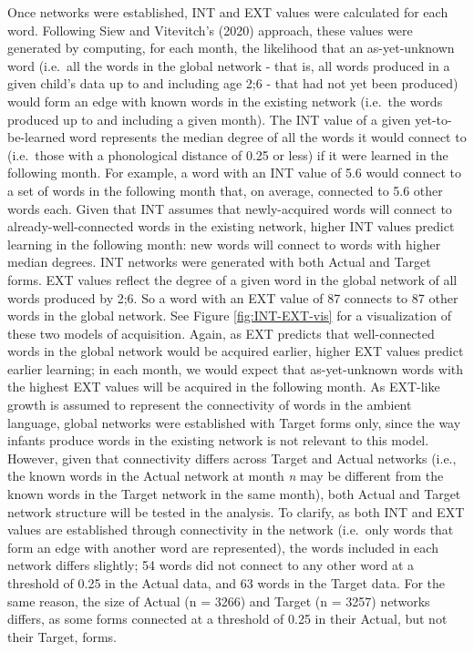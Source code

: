\documentclass[
  man]{apa6}
\begin{document}
Once networks were established, INT and EXT values were calculated for each word. Following Siew and Vitevitch's (2020) approach, these values were generated by computing, for each month, the likelihood that an as-yet-unknown word (i.e.~all the words in the global network - that is, all words produced in a given child's data up to and including age 2;6 - that had not yet been produced) would form an edge with known words in the existing network (i.e.~the words produced up to and including a given month). The INT value of a given yet-to-be-learned word represents the median degree of all the words it would connect to (i.e.~those with a phonological distance of 0.25 or less) if it were learned in the following month. For example, a word with an INT value of 5.6 would connect to a set of words in the following month that, on average, connected to 5.6 other words each. Given that INT assumes that newly-acquired words will connect to already-well-connected words in the existing network, higher INT values predict learning in the following month: new words will connect to words with higher median degrees. INT networks were generated with both Actual and Target forms. EXT values reflect the degree of a given word in the global network of all words produced by 2;6. So a word with an EXT value of 87 connects to 87 other words in the global network. See Figure \ref{fig:INT-EXT-vis} for a visualization of these two models of acquisition. Again, as EXT predicts that well-connected words in the global network would be acquired earlier, higher EXT values predict earlier learning; in each month, we would expect that as-yet-unknown words with the highest EXT values will be acquired in the following month. As EXT-like growth is assumed to represent the connectivity of words in the ambient language, global networks were established with Target forms only, since the way infants produce words in the existing network is not relevant to this model. However, given that connectivity differs across Target and Actual networks (i.e., the known words in the Actual network at month \emph{n} may be different from the known words in the Target network in the same month), both Actual and Target network structure will be tested in the analysis. To clarify, as both INT and EXT values are established through connectivity in the network (i.e.~only words that form an edge with another word are represented), the words included in each network differs slightly; 54 words did not connect to any other word at a threshold of 0.25 in the Actual data, and 63 words in the Target data. For the same reason, the size of Actual (n = 3266) and Target (n = 3257) networks differs, as some forms connected at a threshold of 0.25 in their Actual, but not their Target, forms.
\end{document}
